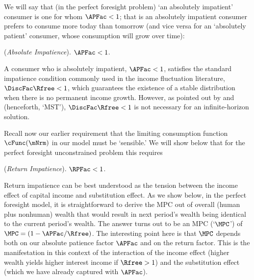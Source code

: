 \documentclass[BufferStockTheory]{subfiles}
\begin{document}
We will say that (in the perfect foresight problem) `an absolutely impatient' consumer is one for whom $\APFac < 1$; that is an absolutely impatient consumer prefers to consume more today than tomorrow (and vice versa for an `absolutely patient' consumer, whose consumption will grow over time):
\hypertarget{AIC}{}
\begin{assumL} (\textit{Absolute Impatience}). \label{ass:AIC}
$\APFac  < 1$. 
\end{assumL}

\begin{remark}
  A consumer who is absolutely impatient, $\APFac<1$, satisfies the standard impatience condition commonly used in the income fluctuation literature, $\DiscFac\Rfree<1$, which guarantees the existence of a stable distribution when there is no permanent income growth. However, as pointed out by \cite{szeidlInvariant} and \cite{maUnboundedDP} (henceforth, `MST'), $\DiscFac\Rfree<1$ is not necessary for an infinite-horizon solution. %
\end{remark}

Recall now our earlier requirement that the limiting consumption function $\cFunc(\mNrm)$ in our model must be `sensible.'
We will show below that for the perfect foresight unconstrained problem this requires
\hypertarget{RIC}{}
\begin{assumL} (\textit{Return Impatience}).\label{ass:RIC}
$\RPFac  < 1$. 
\end{assumL}

Return impatience can be best understood as the tension between the income effect of capital income and substitution effect.
As we show below, in the perfect foresight model, it is straightforward to derive the MPC out of overall (human plus nonhuman) wealth that would result in next period's wealth being identical to the current period's wealth.
The answer turns out to be an MPC (`$\MPC$') of $\MPC=(1-\APFac/\Rfree)$.
The interesting point here is that $\MPC$ depends both on our absolute patience factor $\APFac$ and on the return factor.
This is the manifestation in this context of the interaction of the income effect (higher wealth yields higher interest income if $\Rfree>1$) and the substitution effect (which we have already captured with $\APFac$).
\end{document}
